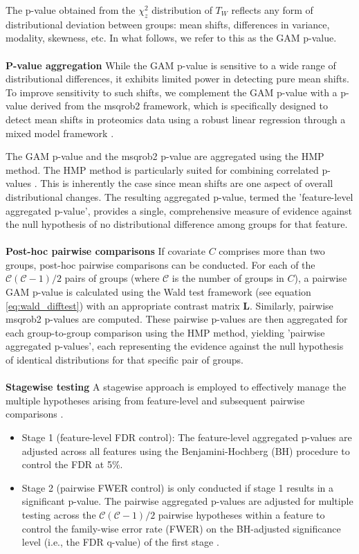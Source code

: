 The p-value obtained from the $\chi^2_z$ distribution of $T_W$ reflects any form of distributional deviation between groups: mean shifts, differences in variance, modality, skewness, etc. In what follows, we refer to this as the GAM p-value.
\\
\\
\textbf{P-value aggregation}
While the GAM p-value is sensitive to a wide range of distributional differences, it exhibits limited power in detecting pure mean shifts. To improve sensitivity to such shifts, we complement the GAM p-value with a p-value derived from the msqrob2 framework, which is specifically designed to detect mean shifts in proteomics data using a robust linear regression through a mixed model framework \cite{msqrob}.

The GAM p-value and the msqrob2 p-value are aggregated using the HMP method. The HMP method is particularly suited for combining correlated p-values \cite{harmonicp}. This is inherently the case since mean shifts are one aspect of overall distributional changes.
The resulting aggregated p-value, termed the 'feature-level aggregated p-value', provides a single, comprehensive measure of evidence against the null hypothesis of no distributional difference among groups for that feature.
\\
\\
\textbf{Post-hoc pairwise comparisons}
If covariate $C$ comprises more than two groups, post-hoc pairwise comparisons can be conducted. For each of the $\mathcal{C}(\mathcal{C}-1)/2$ pairs of groups (where $\mathcal{C}$ is the number of groups in $C$), a pairwise GAM p-value is calculated using the Wald test framework (see equation \ref{eq:wald_difftest}) with an appropriate contrast matrix $\boldsymbol{L}$. Similarly, pairwise msqrob2 p-values are computed. These pairwise p-values are then aggregated for each group-to-group comparison using the HMP method, yielding 'pairwise aggregated p-values', each representing the evidence against the null hypothesis of identical distributions for that specific pair of groups.
\\
\\
\textbf{Stagewise testing}
A stagewise approach is employed to effectively manage the multiple hypotheses arising from feature-level and subsequent pairwise comparisons \cite{stagewise_testing}.
\begin{itemize}
    \item Stage 1 (feature-level FDR control): The feature-level aggregated p-values are adjusted across all features using the Benjamini-Hochberg (BH) procedure to control the FDR at 5\%.

    \item Stage 2 (pairwise FWER control) is only conducted if stage 1 results in a significant p-value. The pairwise aggregated p-values are adjusted for multiple testing across the $\mathcal{C}(\mathcal{C}-1)/2$ pairwise hypotheses within a feature to control the family-wise error rate (FWER) on the BH-adjusted significance level (i.e., the FDR q-value) of the first stage \cite{stager}.
\end{itemize}

